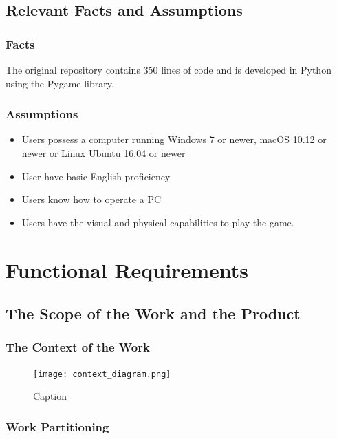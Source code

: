 \documentclass[12pt]{article}
\begin{document}
	\subsection{Relevant Facts and Assumptions}
	\subsubsection{Facts}
	The original repository contains 350 lines of code and is developed in Python using the Pygame library. 
	\subsubsection{Assumptions}
	\begin{itemize}
		\item Users possess a computer running Windows 7 or newer, macOS 10.12 or newer or Linux Ubuntu 16.04 or newer
		\item User have basic English proficiency 
		\item Users know how to operate a PC
		\item Users have the visual and physical capabilities to play the game.
	\end{itemize}
	
	\section{Functional Requirements}
	
	\subsection{The Scope of the Work and the Product}
	
	\subsubsection{The Context of the Work}
	\begin{figure}[!ht]
		\centering
		\texttt{[image: context\_diagram.png]}
		\caption{Caption}
	\end{figure}
	
	\subsubsection{Work Partitioning}
	
\end{document}
